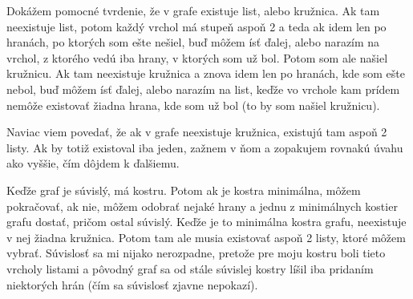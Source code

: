 
Dokážem pomocné tvrdenie, že v grafe existuje list, alebo kružnica. 
Ak tam neexistuje list, potom každý vrchol má stupeň aspoň 2 a teda 
ak idem len po hranách, po ktorých som ešte nešiel, buď môžem ísť 
ďalej, alebo narazím na vrchol, z ktorého vedú iba hrany, v ktorých 
som už bol. Potom som ale našiel kružnicu. Ak tam neexistuje 
kružnica a znova idem len po hranách, kde som ešte nebol, buď môžem 
ísť ďalej, alebo narazím na list, keďže vo vrchole kam prídem nemôže 
existovať žiadna hrana, kde som už bol (to by som našiel kružnicu). 

Naviac viem povedať, že ak v grafe neexistuje kružnica, existujú tam 
aspoň 2 listy. Ak by totiž existoval iba jeden, zažnem v ňom a 
zopakujem rovnakú úvahu ako vyššie, čím dôjdem k ďalšiemu. 


Keďže graf je súvislý, má kostru. Potom ak je kostra minimálna, môžem 
pokračovať, ak nie, môžem odobrať nejaké hrany a jednu z minimálnych 
kostier grafu dostať, pričom ostal súvislý. Keďže je to minimálna kostra 
grafu, neexistuje v nej žiadna kružnica. Potom tam ale musia existovať 
aspoň 2 listy, ktoré môžem vybrať. Súvislosť sa mi nijako nerozpadne, 
pretože pre moju kostru boli tieto vrcholy listami a pôvodný graf sa 
od stále súvislej kostry líšil iba pridaním niektorých hrán (čím sa 
súvislosť zjavne nepokazí).


